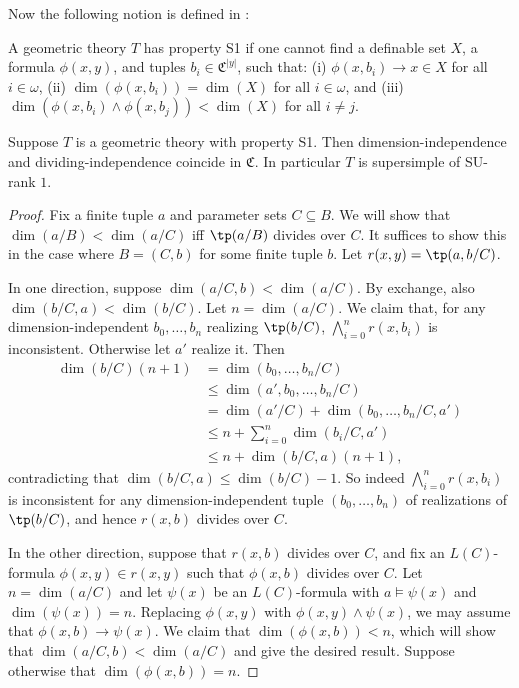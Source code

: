 \documentclass[10pt]{article}
\begin{document}
{Now the following notion is defined in \cite{hrushovski_pillay}:
\begin{definition}
    A geometric theory $T$ has property S1 if one cannot find a definable set $X$, a formula $\phi(x,y)$, and tuples $b_i\in\mathfrak{C}^{|y|}$, such that: (i) $\phi(x,b_i)\to x\in X$ for all $i\in\omega$, (ii) $\dim(\phi(x,b_i))=\dim(X)$ for all $i\in\omega$, and (iii) $\dim(\phi(x,b_i)\wedge\phi(x,b_j))<\dim(X)$ for all $i\neq j$.
\end{definition}

\begin{lemma}
    Suppose $T$ is a geometric theory with property S1. Then dimension-independence and dividing-independence coincide in $\mathfrak{C}$. In particular $T$ is supersimple of SU-rank $1$.
\end{lemma}
\begin{proof}
    Fix a finite tuple $a$ and parameter sets $C\subseteq B$. We will show that $\dim(a/B)<\dim(a/C)$ iff $\tp(a/B)$ divides over $C$. It suffices to show this in the case where $B=(C,b)$ for some finite tuple $b$. Let $r(x,y)=\tp(a,b/C)$.

    In one direction, suppose $\dim(a/C,b)<\dim(a/C)$. By exchange, also $\dim(b/C,a)<\dim(b/C)$. Let $n=\dim(a/C)$. We claim that, for any dimension-independent $b_0,\dots,b_n$ realizing $\tp(b/C)$, $\bigwedge_{i=0}^nr(x,b_i)$ is inconsistent. Otherwise let $a'$ realize it. Then 
    \begin{align*}\dim(b/C)(n+1)&=\dim(b_0,\dots,b_n/C)\\&\leqslant\dim(a',b_0,\dots,b_n/C)\\&= \dim(a'/C)+\dim(b_0,\dots,b_n/C,a')\\&\leqslant n+\sum_{i=0}^n\dim(b_i/C,a')\\&\leqslant n+\dim(b/C,a)(n+1),
    \end{align*}contradicting that $\dim(b/C,a)\leqslant\dim(b/C)-1$. So indeed $\bigwedge_{i=0}^nr(x,b_i)$ is inconsistent for any dimension-independent tuple $(b_0,\dots,b_n)$ of realizations of $\tp(b/C)$, and hence $r(x,b)$ divides over $C$.

    In the other direction, suppose that $r(x,b)$ divides over $C$, and fix an $L(C)$-formula $\phi(x,y)\in r(x,y)$ such that $\phi(x,b)$ divides over $C$. Let $n=\dim(a/C)$ and let $\psi(x)$ be an $L(C)$-formula with $a\models\psi(x)$ and $\dim(\psi(x))=n$. Replacing $\phi(x,y)$ with $\phi(x,y)\wedge\psi(x)$, we may assume that $\phi(x,b)\to\psi(x)$. We claim that $\dim(\phi(x,b))<n$, which will show that $\dim(a/C,b)<\dim(a/C)$ and give the desired result. Suppose otherwise that $\dim(\phi(x,b))=n$.


\end{proof}}
\end{document}
